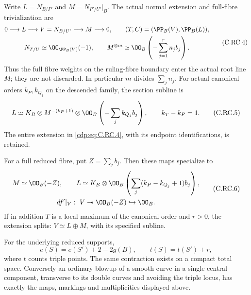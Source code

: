\begin{proposition}
Write
$L=N_{B/P'}$ and $M=N_{P'/U'}|_B$.
The actual normal extension and full-fibre
trivialization are
\[
 \begin{gathered}
 0\longrightarrow L\longrightarrow
       V=N_{B/U'}\longrightarrow M\longrightarrow0,
 \qquad (T,C)=(\PP_B(V),\PP_B(L)),\\
 N_{T/U}\simeq\OO_{\PP_B(V)}(-1),\qquad
 M^{\otimes m}\simeq
             \OO_B\left(-\sum_{j=1}^r n_jb_j\right).
 \end{gathered}
\tag{C.RC.4}\label{cdp:eq:C.RC.4}
\]
Thus the full fibre weights on the ruling-fibre
boundary enter the actual root line $M$; they are
not discarded. In particular $m$ divides
$\sum_jn_j$. For actual canonical orders $k_P,k_{Q_j}$
on the descended family, the section subline is
\[
 L\simeq K_B\otimes M^{-(k_P+1)}
                    \otimes\OO_B\left(-\sum_jk_{Q_j}b_j\right),
             \qquad k_T-k_P=1.
\tag{C.RC.5}\label{cdp:eq:C.RC.5}
\]
The entire extension in \eqref{cdp:eq:C.RC.4}, with its endpoint
identifications, is retained.

For a full reduced fibre, put $Z=\sum_jb_j$. Then
these maps specialize to
\[
 \begin{gathered}
 M\simeq\OO_B(-Z),\qquad
 L\simeq K_B\otimes
              \OO_B\left(\sum_j(k_P-k_{Q_j}+1)b_j\right),\\
 df'|_V:\ V\twoheadrightarrow
            \OO_B(-Z)\hookrightarrow\OO_B.
 \end{gathered}
\tag{C.RC.6}\label{cdp:eq:C.RC.6}
\]
If in addition $T$ is a local maximum of the
canonical order and $r>0$, the extension splits:
$V\simeq L\oplus M$, with its specified subline.

For the underlying reduced supports,
\[
              e(S)=e(S')+2-2g(B),\qquad
              t(S)=t(S')+r,
\tag{C.RC.7}\label{cdp:eq:C.RC.7}
\]
where $t$ counts triple points. The same contraction
exists on a compact total space. Conversely an
ordinary blowup of a smooth curve in a single
central component, transverse to its double curves
and avoiding the triple locus, has exactly the
maps, markings and multiplicities displayed above.
\end{proposition}

